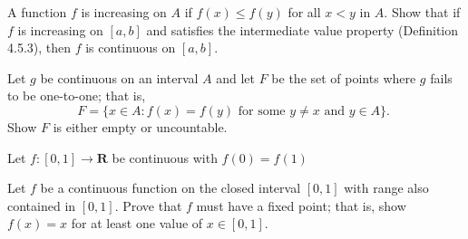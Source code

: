 \begin{exercise}
  A function $f$ is increasing on $A$ if $f(x) \leq f(y)$ for all $x<y$ in $A$. Show that if $f$ is increasing on $[a, b]$ and satisfies the intermediate value property (Definition 4.5.3), then $f$ is continuous on $[a, b]$.
\end{exercise}
\begin{solution}
  \TODO
\end{solution}

\begin{exercise}
  Let $g$ be continuous on an interval $A$ and let $F$ be the set of points where $g$ fails to be one-to-one; that is,
  $$
  F=\{x \in A: f(x)=f(y) \text { for some } y \neq x \text { and } y \in A\} \text {. }
  $$
  Show $F$ is either empty or uncountable.
\end{exercise}
\begin{solution}
  \TODO
\end{solution}

\begin{exercise}
\end{exercise}
\begin{solution}
  \TODO
\end{solution}

\begin{exercise}
  Let $f:[0,1] \rightarrow \mathbf{R}$ be continuous with $f(0)=f(1)$
\end{exercise}
\begin{solution}
  \TODO
\end{solution}

\begin{exercise}
  Let $f$ be a continuous function on the closed interval $[0,1]$ with range also contained in $[0,1]$. Prove that $f$ must have a fixed point; that is, show $f(x)=x$ for at least one value of $x \in[0,1]$.
\end{exercise}
\begin{solution}
  \TODO
\end{solution}


